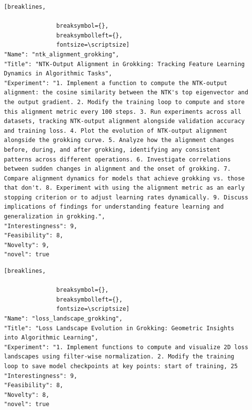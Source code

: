 \begin{tcolorbox}[
  breakable,
  colback  = blue!5!white,
  colframe = blue!75!black,
  title    = {Idea 25/50 - \texttt{ntk\_alignment\_grokking}},
  fontupper=\scriptsize\ttfamily,
]
\begin{Verbatim}[breaklines,

               breaksymbol={},
               breaksymbolleft={},
               fontsize=\scriptsize]
"Name": "ntk_alignment_grokking",
"Title": "NTK-Output Alignment in Grokking: Tracking Feature Learning Dynamics in Algorithmic Tasks",
"Experiment": "1. Implement a function to compute the NTK-output alignment: the cosine similarity between the NTK's top eigenvector and the output gradient. 2. Modify the training loop to compute and store this alignment metric every 100 steps. 3. Run experiments across all datasets, tracking NTK-output alignment alongside validation accuracy and training loss. 4. Plot the evolution of NTK-output alignment alongside the grokking curve. 5. Analyze how the alignment changes before, during, and after grokking, identifying any consistent patterns across different operations. 6. Investigate correlations between sudden changes in alignment and the onset of grokking. 7. Compare alignment dynamics for models that achieve grokking vs. those that don't. 8. Experiment with using the alignment metric as an early stopping criterion or to adjust learning rates dynamically. 9. Discuss implications of findings for understanding feature learning and generalization in grokking.",
"Interestingness": 9,
"Feasibility": 8,
"Novelty": 9,
"novel": true
\end{Verbatim}
\end{tcolorbox}

\begin{tcolorbox}[
  breakable,
  colback  = blue!5!white,
  colframe = blue!75!black,
  title    = {Idea 26/50 - \texttt{loss\_landscape\_grokking}},
  fontupper=\scriptsize\ttfamily,
]
\begin{Verbatim}[breaklines,

               breaksymbol={},
               breaksymbolleft={},
               fontsize=\scriptsize]
"Name": "loss_landscape_grokking",
"Title": "Loss Landscape Evolution in Grokking: Geometric Insights into Algorithmic Learning",
"Experiment": "1. Implement functions to compute and visualize 2D loss landscapes using filter-wise normalization. 2. Modify the training loop to save model checkpoints at key points: start of training, 25
"Interestingness": 9,
"Feasibility": 8,
"Novelty": 8,
"novel": true
\end{Verbatim}
\end{tcolorbox}

